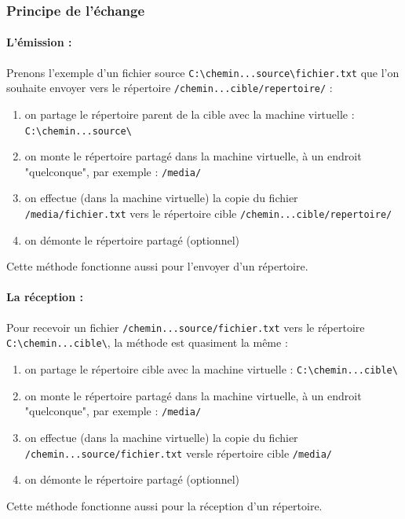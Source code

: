 
\subsubsection{Principe de l'échange}
\label{Principe de l'échange par répertoire partagé}

\paragraph{L'émission :}
Prenons l'exemple d'un fichier source \lstinline{C:\chemin...source\fichier.txt} que l'on souhaite envoyer vers le répertoire \lstinline{/chemin...cible/repertoire/} :
\begin{enumerate}
	\item on partage le répertoire parent de la cible avec la machine virtuelle : \lstinline{C:\chemin...source\}
	\item on monte le répertoire partagé dans la machine virtuelle, à un endroit "quelconque", par exemple : \lstinline{/media/}
	\item on effectue (dans la machine virtuelle) la copie du fichier \lstinline{/media/fichier.txt} vers le répertoire cible \lstinline{/chemin...cible/repertoire/}
	\item on démonte le répertoire partagé (optionnel)
\end{enumerate}
Cette méthode fonctionne aussi pour l'envoyer d'un répertoire.
\\


\paragraph{La réception :}
Pour recevoir un fichier \lstinline{/chemin...source/fichier.txt} vers le répertoire \lstinline{C:\chemin...cible\}, la méthode est quasiment la même :
\begin{enumerate}
	\item on partage le répertoire cible avec la machine virtuelle : \lstinline{C:\chemin...cible\}
	\item on monte le répertoire partagé dans la machine virtuelle, à un endroit "quelconque", par exemple : \lstinline{/media/}
	\item on effectue (dans la machine virtuelle) la copie du fichier \lstinline{/chemin...source/fichier.txt} versle répertoire cible \lstinline{/media/}
	\item on démonte le répertoire partagé (optionnel)
\end{enumerate}
Cette méthode fonctionne aussi pour la réception d'un répertoire.
\\




